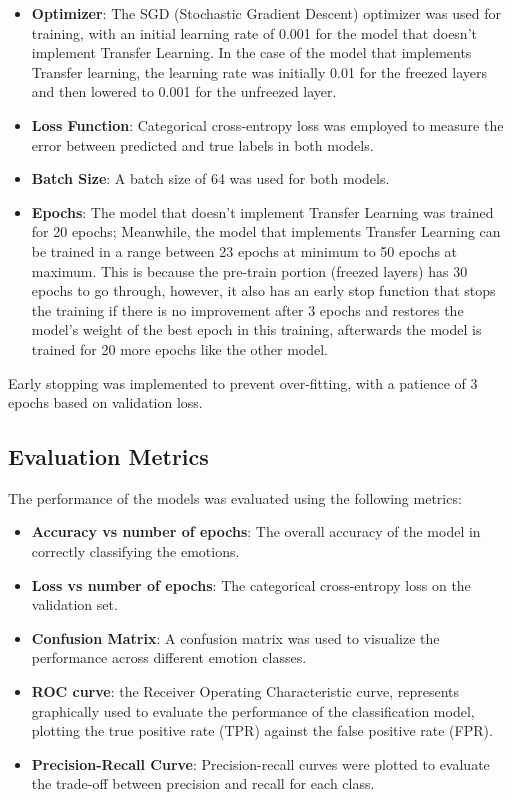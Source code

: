 \documentclass[conference]{IEEEtran}
\begin{document}
\begin{itemize}
    \item \textbf{Optimizer}: The SGD (Stochastic Gradient Descent) optimizer was used for training, with an initial learning rate of 0.001 for the model that doesn't implement Transfer Learning. In the case of the model that implements Transfer learning, the learning rate was initially 0.01 for the freezed layers and then lowered to 0.001 for the unfreezed layer.
    \item \textbf{Loss Function}: Categorical cross-entropy loss was employed to measure the error between predicted and true labels in both models.
    \item \textbf{Batch Size}: A batch size of 64 was used for both models.
    \item \textbf{Epochs}: The model that doesn't implement Transfer Learning was trained for 20 epochs; Meanwhile, the model that implements Transfer Learning can be trained in a range between 23 epochs at minimum to 50 epochs at maximum. This is because the pre-train portion (freezed layers) has 30 epochs to go through, however, it also has an early stop function that stops the training if there is no improvement after 3 epochs and restores the model's weight of the best epoch in this training, afterwards the model is trained for 20 more epochs like the other model.
\end{itemize}

Early stopping was implemented to prevent over-fitting, with a patience of 3 epochs based on validation loss.


\subsection{Evaluation Metrics}
The performance of the models was evaluated using the following metrics:

\begin{itemize}
    \item \textbf{Accuracy vs number of epochs}: The overall accuracy of the model in correctly classifying the emotions.
    \item \textbf{Loss vs number of epochs}: The categorical cross-entropy loss on the validation set.
    \item \textbf{Confusion Matrix}: A confusion matrix was used to visualize the performance across different emotion classes.
    \item \textbf{ROC curve}: the Receiver Operating Characteristic curve, represents graphically used to evaluate the performance of the classification model, plotting the true positive rate (TPR) against the false positive rate (FPR).
    \item \textbf{Precision-Recall Curve}: Precision-recall curves were plotted to evaluate the trade-off between precision and recall for each class.
\end{itemize}
\end{document}
